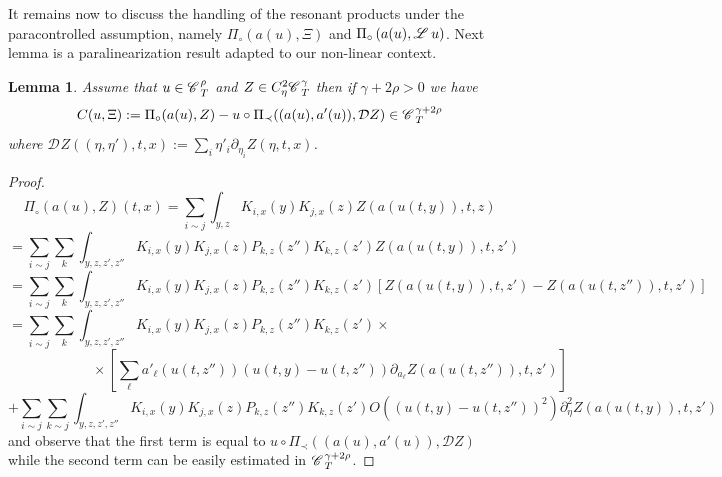 \documentclass[11pt,reqno]{amsart}
\newcommand{\assign}{:=}
\newtheorem{lemma}[theorem]{Lemma}
\newcommand{\CC}{\mathscr{C} \hspace{.1em}}
\newcommand{\LL}{\mathscr{L} \hspace{.2em}}
\begin{document}
It remains now to discuss the handling of the resonant products under the
paracontrolled assumption, namely $\Pi_{\circ} (a (u), \Xi)$ and $\Pi_{\circ}
\left( a (u), \LL u \right)$. Next lemma is a paralinearization result adapted
to our non-linear context.

\begin{lemma}
  Assume that $u \in \CC_T^{\rho}$ and $Z \in C_{\eta}^2 \CC^{\gamma}_T$ then
  if $\gamma + 2 \rho > 0$ we have
  \[ C (u, \Xi) \assign \Pi_{\circ} (a (u), Z) - u \circ \Pi_{\prec} ((a (u),
     a' (u)), \mathcal{D}Z) \in \CC_T^{\gamma + 2 \rho} \]
  where $\mathcal{D}_{} Z ((\eta, \eta'), t, x) \assign \sum_i \eta'_i
  \partial_{\eta_i} Z (\eta, t, x)$.
\end{lemma}

\begin{proof}
  \[ \Pi_{\circ} (a (u), Z) (t, x) = \sum_{i \sim j} \int_{y, z} K_{i, x} (y)
     K_{j, x} (z) Z (a (u (t, y)), t, z) \]
  \[ = \sum_{i \sim j} \sum_k \int_{y, z, z', z''} K_{i, x} (y) K_{j, x} (z)
     P_{k, z} (z'') K_{k, z} (z') Z (a (u (t, y)), t, z') \]
  \[ = \sum_{i \sim j} \sum_k \int_{y, z, z', z''} K_{i, x} (y) K_{j, x} (z)
     P_{k, z} (z'') K_{k, z} (z') [Z (a (u (t, y)), t, z') - Z (a (u (t,
     z'')), t, z')] \]
  \[ = \sum_{i \sim j} \sum_k \int_{y, z, z', z''} K_{i, x} (y) K_{j, x} (z)
     P_{k, z} (z'') K_{k, z} (z') \times \qquad \qquad \qquad \qquad \qquad \]
  \[ \qquad \qquad \qquad \times \left[ \sum_{\ell} a'_{\ell} (u (t, z'')) (u
     (t, y) - u (t, z'')) \partial_{a_{\ell}} Z (a (u (t, z'')), t, z')
     \right] \]
  \[ + \sum_{i \sim j} \sum_{k \sim j} \int_{y, z, z', z''} K_{i, x} (y) K_{j,
     x} (z) P_{k, z} (z'') K_{k, z} (z') O ((u (t, y) - u (t, z''))^2)
     \partial_{\eta}^2 Z (a (u (t, y)), t, z') \]
  and observe that the first term is equal to $u \circ \Pi_{\prec} ((a (u), a'
  (u)), \mathcal{D}Z)$ while the second term can be easily estimated in
  $\CC_T^{\gamma + 2 \rho}$. 
\end{proof}
\end{document}
